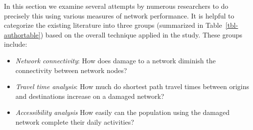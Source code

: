 \documentclass[]{ascelike-new}
\begin{document}
In this section we examine several attempts by numerous researchers to
do precisely this using various measures of network performance. It is
helpful to categorize the existing literature into three groups
(summarized in Table~\ref{tbl-authortable}) based on the overall
technique applied in the study. These groups include:

\begin{itemize}
\item
  \emph{Network connectivity}: How does damage to a network diminish the
  connectivity between network nodes?
\item
  \emph{Travel time analysis}: How much do shortest path travel times
  between origins and destinations increase on a damaged network?
\item
  \emph{Accessibility analysis} How easily can the population using the
  damaged network complete their daily activities?
\end{itemize}
\end{document}
